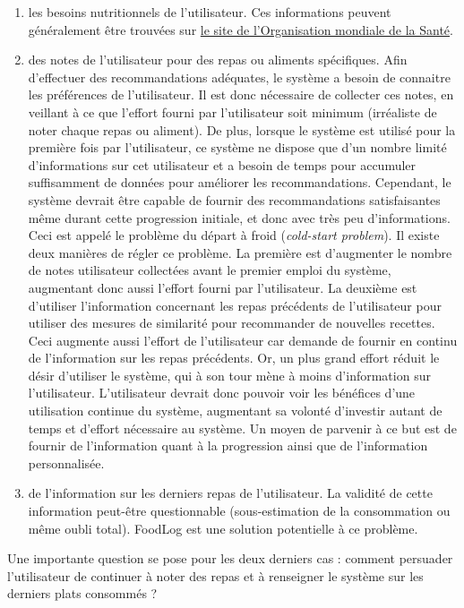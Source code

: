 \documentclass[a4paper, 11pt]{article}
\begin{document}
\begin{enumerate}
	\item les besoins nutritionnels de l'utilisateur. Ces informations peuvent généralement être trouvées sur \href{http://www.who.int/topics/nutrition/en/}{le site de l'Organisation mondiale de la Santé}. 
	\item des notes de l'utilisateur pour des repas ou aliments spécifiques. Afin d'effectuer des recommandations adéquates, le système a besoin de connaitre les préférences de l'utilisateur. Il est donc nécessaire de collecter ces notes, en veillant à ce que l'effort fourni par l'utilisateur soit minimum (irréaliste de noter chaque repas ou aliment). De plus, lorsque le système est utilisé pour la première fois par l'utilisateur, ce système ne dispose que d'un nombre limité d'informations sur cet utilisateur et a besoin de temps pour accumuler suffisamment de données pour améliorer les recommandations. Cependant, le système devrait être capable de fournir des recommandations satisfaisantes même durant cette progression initiale, et donc avec très peu d'informations. Ceci est appelé le problème du départ à froid (\textit{cold-start problem}). Il existe deux manières de régler ce problème. La première est d'augmenter le nombre de notes utilisateur collectées avant le premier emploi du système, augmentant donc aussi l'effort fourni par l'utilisateur. La deuxième est d'utiliser l'information concernant les repas précédents de l'utilisateur pour utiliser des mesures de similarité pour recommander de nouvelles recettes. Ceci augmente aussi l'effort de l'utilisateur car demande de fournir en continu de l'information sur les repas précédents. Or, un plus grand effort réduit le désir d'utiliser le système, qui à son tour mène à moins d'information sur l'utilisateur. L'utilisateur devrait donc pouvoir voir les bénéfices d'une utilisation continue du système, augmentant sa volonté d'investir autant de temps et d'effort nécessaire au système. Un moyen de parvenir à ce but est de fournir de l'information quant à la progression ainsi que de l'information personnalisée.
	\item de l'information sur les derniers repas de l'utilisateur. La validité de cette information peut-être questionnable (sous-estimation de la consommation ou même oubli total). FoodLog est une solution potentielle à ce problème. 
\end{enumerate}
Une importante question se pose pour les deux derniers cas : comment persuader l'utilisateur de continuer à noter des repas et à renseigner le système sur les derniers plats consommés ? 
\end{document}
